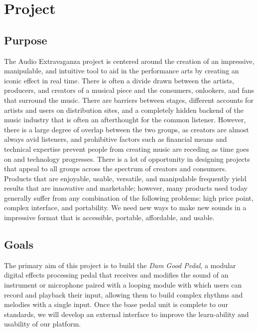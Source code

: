 \section{Project}

\subsection{Purpose}
The Audio Extravaganza project is centered around the creation of an impressive, manipulable, and intuitive tool to aid in the performance arts by creating an iconic effect in real time.
There is often a divide drawn between the artists, producers, and creators of a musical piece and the consumers, onlookers, and fans that surround the music. There are barriers between stages, different accounts for artists and users on distribution sites, and a completely hidden backend of the music industry that is often an afterthought for the common listener.
However, there is a large degree of overlap between the two groups, as creators are almost always avid listeners, and prohibitive factors such as financial means and technical expertise prevent people from creating music are receding as time goes on and technology progresses.
There is a lot of opportunity in designing projects that appeal to all groups across the spectrum of creators and consumers.
Products that are enjoyable, usable, versatile, and manipulable frequently yield results that are innovative and marketable; however, many products used today generally suffer from any combination of the following problems: high price point, complex interface, and portability.
We need new ways to make new sounds in a impressive format that is accessible, portable, affordable, and usable.

\subsection{Goals}
    The primary aim of this project is to build the \textit{Dam Good Pedal}, a modular digital effects processing pedal that receives and modifies the sound of an instrument or microphone paired with a looping module with which users can record and playback their input, allowing them to build complex rhythms and melodies with a single input. Once the base pedal unit is complete to our standards, we will develop an external interface to improve the learn-ability and usability of our platform.
    
